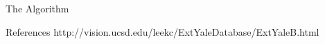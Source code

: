 \documentclass[final]{beamer}
\newlength{\onecolwid}
\newcommand{\omitt}[1]{}
\begin{document}
\begin{frame}[t]
\begin{columns}[t]
\begin{column}{\onecolwid}
\begin{block}{The Algorithm}
\begin{figure}[h]
\begin{itemize}
\end{itemize}
\end{figure}

\end{block}

\vspace{-8mm}

\omitt{

\setbeamercolor{block title}{fg=red,bg=white} %

\begin{block}{Acknowledgements}

\end{block}

\vspace{-8mm}}


\begin{block}{References}
http://vision.ucsd.edu/leekc/ExtYaleDatabase/ExtYaleB.html
\small{
\vspace{0.5in}}

\end{block}

\end{column} %

\end{columns} %

\end{frame} %
\end{document}
